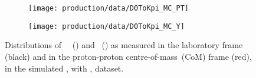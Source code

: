\begin{figure}%
  \begin{subfigure}[b]{0.5\textwidth}
    \centering
    \texttt{[image: production/data/D0ToKpi\_MC\_PT]}
    \caption{\pT}
    \label{fig:prod:data:com_boost:pt}
  \end{subfigure}
  \begin{subfigure}[b]{0.5\textwidth}
    \centering
    \texttt{[image: production/data/D0ToKpi\_MC\_Y]}
    \caption{\rapidity}
    \label{fig:prod:data:com_boost:y}
  \end{subfigure}
  \caption{%
    Distributions of \PDzero\ \pT~() and 
    \rapidity~() as measured in the 
    laboratory frame (black) and in the proton-proton centre-of-mass~(CoM) 
    frame (red), in the simulated \DstToDzpi, with \DzToKpi, dataset.
  }
  \label{fig:prod:data:com_boost}
\end{figure}
